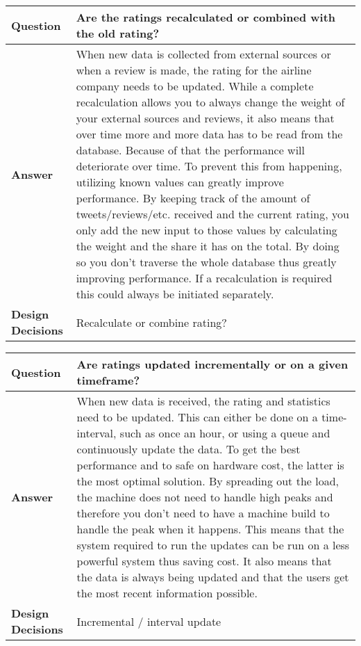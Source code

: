 \begin{longtable}{| l |  p{12cm} |}
\hline
\textbf{Question} & \textbf{ Are the ratings recalculated or combined with the old rating? } \\ \hline
\textbf{Answer} & When new data is collected from external sources or when a review is made, the rating for the airline company needs to be updated. While a complete recalculation allows you to always change the weight of your external sources and reviews, it also means that over time more and more data has to be read from the database. Because of that the performance will deteriorate over time.
To prevent this from happening, utilizing known values can greatly improve performance. By keeping track of the amount of tweets/reviews/etc. received and the current rating, you only add the new input to those values by calculating the weight and the share it has on the total. By doing so you don't traverse the whole database thus greatly improving performance. If a recalculation is required this could always be initiated separately.
 \\ \hline
\textbf{Design Decisions} & Recalculate or combine rating? \\ \hline
\end{longtable}

\begin{longtable}{| l |  p{12cm} |}
\hline
\textbf{Question} & \textbf{Are ratings updated incrementally or on a given timeframe? } \\ \hline
\textbf{Answer} & When new data is received, the rating and statistics need to be updated. This can either be done on a time-interval, such as once an hour, or using a queue and continuously update the data. To get the best performance and to safe on hardware cost, the latter is the most optimal solution. By spreading out the load, the machine does not need to handle high peaks and therefore you don't need to have a machine build to handle the peak when it happens. This means that the system required to run the updates can be run on a less powerful system thus saving cost. It also means that the data is always being updated and that the users get the most recent information possible.
 \\ \hline
\textbf{Design Decisions} & Incremental / interval update \\ \hline
\end{longtable}

